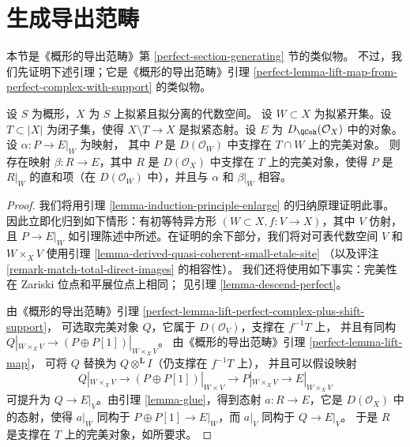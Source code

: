 \section{生成导出范畴}
\label{section-generating}

\noindent
本节是《概形的导出范畴》第 \ref{perfect-section-generating} 节的类似物。
不过，我们先证明下述引理；它是《概形的导出范畴》引理
\ref{perfect-lemma-lift-map-from-perfect-complex-with-support} 的类似物。

\begin{lemma}
\label{lemma-lift-map-from-perfect-complex-with-support}
设 $S$ 为概形，$X$ 为 $S$ 上拟紧且拟分离的代数空间。
设 $W \subset X$ 为拟紧开集。设 $T \subset |X|$ 为闭子集，使得
$X \setminus T \to X$ 是拟紧态射。设 $E$ 为
$D_\QCoh(\mathcal{O}_X)$ 中的对象。设 $\alpha : P \to E|_W$ 为映射，
其中 $P$ 是 $D(\mathcal{O}_W)$ 中支撑在 $T \cap W$ 上的完美对象。
则存在映射 $\beta : R \to E$，其中 $R$ 是
$D(\mathcal{O}_X)$ 中支撑在 $T$ 上的完美对象，使得 $P$ 是
$R|_W$ 的直和项（在 $D(\mathcal{O}_W)$ 中），并且与 $\alpha$ 和
$\beta|_W$ 相容。%
\end{lemma}

\begin{proof}
我们将用引理 \ref{lemma-induction-principle-enlarge} 的归纳原理证明此事。
因此立即化归到如下情形：有初等特异方形
$(W \subset X, f : V \to X)$，其中 $V$ 仿射，且
$P \to E|_W$ 如引理陈述中所述。在证明的余下部分，我们将对可表代数空间
$V$ 和 $W \times_X V$ 使用引理
\ref{lemma-derived-quasi-coherent-small-etale-site}
（以及评注 \ref{remark-match-total-direct-images} 的相容性）。
我们还将使用如下事实：完美性在 Zariski 位点和平展位点上相同；
见引理 \ref{lemma-descend-perfect}。

\medskip\noindent
由《概形的导出范畴》引理
\ref{perfect-lemma-lift-perfect-complex-plus-shift-support}，
可选取完美对象 $Q$，它属于 $D(\mathcal{O}_V)$，支撑在 $f^{-1}T$ 上，
并且有同构
$Q|_{W \times_X V} \to (P \oplus P[1])|_{W \times_X V}$。
由《概形的导出范畴》引理 \ref{perfect-lemma-lift-map}，
可将 $Q$ 替换为 $Q \otimes^\mathbf{L} I$（仍支撑在 $f^{-1}T$ 上），
并且可以假设映射
$$
Q|_{W \times_X V} \to (P \oplus P[1])|_{W \times V} %
\longrightarrow P|_{W \times_X V}
\longrightarrow
E|_{W \times_X V}
$$
可提升为 $Q \to E|_V$。由引理 \ref{lemma-glue}，得到态射
$a : R \to E$，它是 $D(\mathcal{O}_X)$ 中的态射，使得 $a|_W$
同构于 $P \oplus P[1] \to E|_W$，而 $a|_V$ 同构于
$Q \to E|_V$。%
于是 $R$ 是支撑在 $T$ 上的完美对象，如所要求。
\end{proof}

